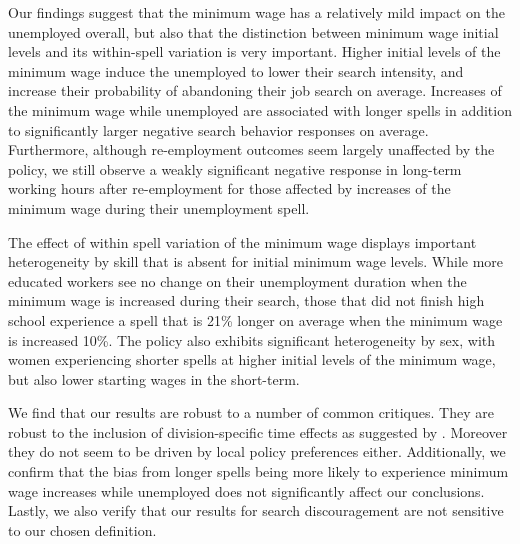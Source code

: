 \documentclass{article}
\begin{document}
Our findings suggest that the minimum wage has a relatively mild impact on the unemployed overall, but also that the distinction between minimum wage initial levels and its within-spell variation is very important. Higher initial levels of the minimum wage induce the unemployed to lower their search intensity, and increase their probability of abandoning their job search on average. Increases of the minimum wage while unemployed are associated with longer spells in addition to significantly larger negative search behavior responses on average. Furthermore, although re-employment outcomes seem largely unaffected by the policy, we still observe a weakly significant negative response in long-term working hours after re-employment for those affected by increases of the minimum wage during their unemployment spell.

The effect of within spell variation of the minimum wage displays important heterogeneity by skill that is absent for initial minimum wage levels. While more educated workers see no change on their unemployment duration when the minimum wage is increased during their search, those that did not finish high school experience a spell that is 21\% longer on average when the minimum wage is increased 10\%. The policy also exhibits significant heterogeneity by sex, with women experiencing shorter spells at higher initial levels of the minimum wage, but also lower starting wages in the short-term.

We find that our results are robust to a number of common critiques. They are robust to the inclusion of division-specific time effects as suggested by \cite{allegretto2011minimum}. Moreover they do not seem to be driven by local policy preferences either. Additionally, we confirm that the bias from longer spells being more likely to experience minimum wage increases while unemployed does not significantly affect our conclusions. Lastly, we also verify that our results for search discouragement are not sensitive to our chosen definition.
 
\end{document}
